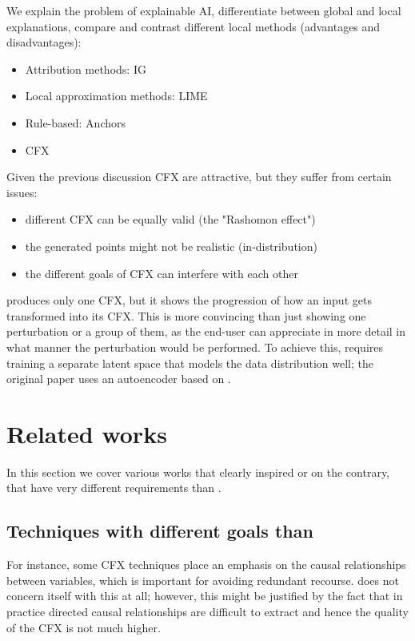 \documentclass[../main.tex]{subfiles}
\begin{document}
We explain the problem of explainable AI, differentiate between global and local explanations, compare and contrast different local methods (advantages and disadvantages):
\begin{itemize}
    \item Attribution methods: IG
    \item Local approximation methods: LIME
    \item Rule-based: Anchors
    \item CFX
\end{itemize}
 
Given the previous discussion CFX are attractive, but they suffer from certain issues:
\begin{itemize}
    \item different CFX can be equally valid (the "Rashomon effect")
    \item the generated points might not be realistic (in-distribution)
    \item the different goals of CFX can interfere with each other
\end{itemize}

\ls{} produces only one CFX, but it shows the progression of how an input gets transformed into its CFX. This is more convincing than just showing one perturbation or a group of them, as the end-user can appreciate in more detail in what manner the perturbation would be performed.
To achieve this, \ls{} requires training a separate latent space that models the data distribution well; \eg{} the original paper uses an autoencoder based on .

\section{Related works}

In this section we cover various works that clearly inspired \ls{} or on the contrary, that have very different requirements than \ls{}.

\subsection{Techniques with different goals than \ls{}}

For instance, some CFX techniques place an emphasis on the causal relationships between variables, which is important for avoiding redundant recourse. 
\ls{} does not concern itself with this at all; however, this might be justified by the fact that in practice directed causal relationships are difficult to extract and hence the quality of the CFX is not much higher.
\end{document}
